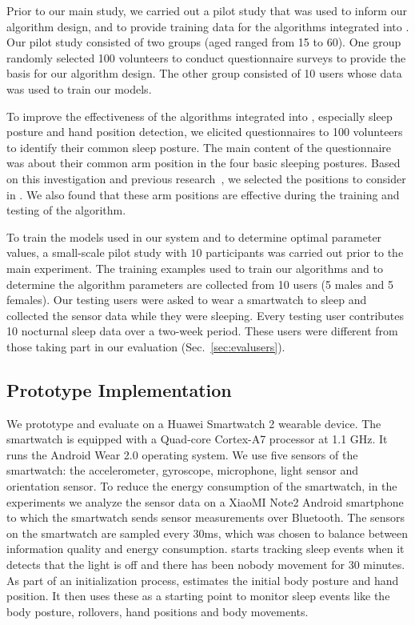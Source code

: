 Prior to our main study, we carried out a pilot study that was used to inform our algorithm design, and to provide training data for the algorithms integrated into {\systemname}. Our pilot study consisted of two groups (aged ranged from 15 to 60). One group  randomly selected 100 volunteers to conduct questionnaire surveys to provide the basis for our algorithm design. The other group consisted of 10 users whose data was used to train our models.


To improve the effectiveness of the algorithms integrated into {\systemname}, especially sleep posture and hand position detection, we elicited questionnaires to 100 volunteers to identify their common sleep posture. The main content of the questionnaire was about their common arm position in the four basic sleeping postures. Based on this investigation and previous research~\cite{position2014,HandPosition2}, we selected the positions to consider in {\systemname}. We also found that these arm positions are effective during the training and testing of the algorithm.

To train the models used in our system and to determine optimal parameter values, a small-scale pilot study with $10$ participants was carried out prior to the main experiment. The training examples used to train our algorithms and to determine the algorithm parameters are collected from 10 users (5 males and 5 females). Our testing users were asked to wear a smartwatch to sleep and collected the sensor data while they were sleeping. Every testing user contributes 10 nocturnal sleep data over a two-week period. These users were different from those taking part in our evaluation (Sec.~\ref{sec:evalusers}).



\subsection{Prototype Implementation \label{sec:implementation}}
We prototype and evaluate {\systemname} on a Huawei Smartwatch 2 wearable device. The smartwatch is equipped with a Quad-core Cortex-A7 processor at 1.1 GHz. It runs the Android Wear 2.0 operating system. We use five sensors of the smartwatch: the accelerometer, gyroscope, microphone, light sensor and orientation sensor. To reduce the energy consumption of the smartwatch, in the experiments we analyze the sensor data on a XiaoMI Note2 Android smartphone to which the smartwatch sends sensor measurements over Bluetooth. The sensors on the smartwatch are sampled every $30$ms, which was chosen to balance between information quality and energy consumption. {\systemname} starts tracking sleep events when it detects that the light is off and there has been nobody movement for 30 minutes. As part of an initialization process, {\systemname} estimates the initial body posture and hand position. It then uses these as a starting point to monitor sleep events like the body posture, rollovers, hand positions and body movements.
